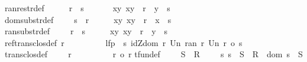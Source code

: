 \begin{isabellebody}
ran{\isacharunderscore}restr{\isacharunderscore}def{\isacharcolon}\ \ \ \ \ \ {\isachardoublequoteopen}r\ {\isacharcolon}{\isachargreater}\ s\ \ \ \ \ \ {\isacharequal}{\isacharequal}\ {\isacharbraceleft}{\isacharparenleft}x{\isacharcomma}y{\isacharparenright}{\isachardot}\ {\isacharparenleft}x{\isacharcomma}y{\isacharparenright}\ {\isacharcolon}\ r\ {\isacharampersand}\ y\ {\isacharcolon}\ s{\isacharbraceright}{\isachardoublequoteclose}\isanewline
dom{\isacharunderscore}substr{\isacharunderscore}def{\isacharcolon}\ \ \ \ \ {\isachardoublequoteopen}s\ {\isacharless}{\isacharminus}{\isacharcolon}\ r\ \ \ \ \ {\isacharequal}{\isacharequal}\ {\isacharbraceleft}{\isacharparenleft}x{\isacharcomma}y{\isacharparenright}{\isachardot}\ {\isacharparenleft}x{\isacharcomma}y{\isacharparenright}\ {\isacharcolon}\ r\ {\isacharampersand}\ x\ {\isachartilde}{\isacharcolon}\ s{\isacharbraceright}{\isachardoublequoteclose}\isanewline
ran{\isacharunderscore}substr{\isacharunderscore}def{\isacharcolon}\ \ \ \ \ {\isachardoublequoteopen}r\ {\isacharcolon}{\isacharminus}{\isachargreater}\ s\ \ \ \ \ {\isacharequal}{\isacharequal}\ {\isacharbraceleft}{\isacharparenleft}x{\isacharcomma}y{\isacharparenright}{\isachardot}\ {\isacharparenleft}x{\isacharcomma}y{\isacharparenright}\ {\isacharcolon}\ r\ {\isacharampersand}\ y\ {\isachartilde}{\isacharcolon}\ s{\isacharbraceright}{\isachardoublequoteclose}\isanewline
\isanewline
\isanewline
{}\isamarkupfalse%
\isanewline
\isanewline
ref{\isacharunderscore}trans{\isacharunderscore}clos{\isacharunderscore}def{\isacharcolon}\ {\isachardoublequoteopen}r{\isacharpercent}{\isacharasterisk}\ \ \ \ \ \ \ \ \ {\isacharequal}{\isacharequal}\ lfp\ {\isacharparenleft}{\isacharpercent}\ s{\isachardot}\ idZ{\isacharparenleft}dom\ r\ Un\ ran\ r{\isacharparenright}\ Un\ {\isacharparenleft}r\ {\isacharpercent}o\ s{\isacharparenright}{\isacharparenright}{\isachardoublequoteclose}\isanewline
trans{\isacharunderscore}clos{\isacharunderscore}def{\isacharcolon}\ \ \ \ \ {\isachardoublequoteopen}r{\isacharpercent}{\isacharplus}\ \ \ \ \ \ \ \ \ {\isacharequal}{\isacharequal}\ r\ {\isacharpercent}o\ r{\isacharpercent}{\isacharasterisk}{\isachardoublequoteclose}\isanewline
\isanewline
\isanewline
tfun{\isacharunderscore}def{\isacharcolon}\ \ \ \ \ {\isachardoublequoteopen}S\ {\isacharminus}{\isacharminus}{\isacharminus}{\isachargreater}\ R\ \ \ \ {\isacharequal}{\isacharequal}\ {\isacharbraceleft}s{\isachardot}\ s\ {\isacharcolon}\ S\ {\isacharminus}{\isacharbar}{\isacharminus}{\isachargreater}\ R\ {\isacharampersand}\ dom\ s\ {\isacharequal}\ S{\isacharbraceright}{\isachardoublequoteclose}\isanewline

\end{isabellebody}
